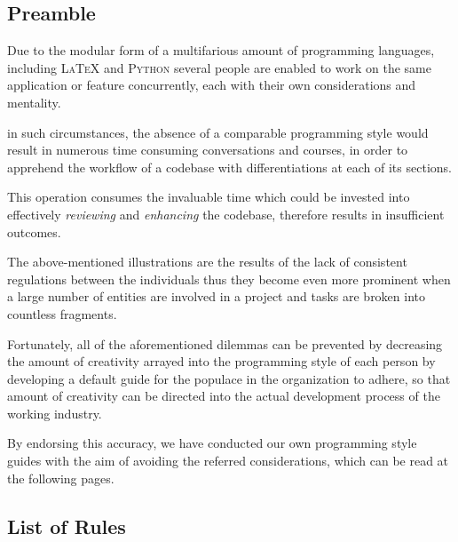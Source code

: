 \documentclass[13pt]{scrarticle}
\newcommand{\header}[1]{ \textsf{#1} \relax{}}
\newcommand{\important}[1]{\textit{#1}}
\newcommand{\name}[1]{{\textsc{#1}}}
\begin{document}
    \subsection{\header{Preamble}}


    Due to the modular form of a multifarious amount of programming languages,
    including \name{\LaTeX} and \name{Python}\footnotemark{}
    several people are enabled to work on the same application or feature concurrently,
    each with their own considerations and mentality. \newline

    in such circumstances, the absence of a comparable programming style would result in numerous time consuming conversations and courses,
    in order to apprehend the workflow of a codebase with differentiations at each of its sections. \newline

    This operation consumes the invaluable time which could be invested into effectively \important{reviewing} and \important{enhancing} the codebase,
    therefore results in insufficient outcomes. \newline


    The above-mentioned illustrations are the results of the lack of consistent regulations between the individuals
    thus they become even more prominent when a large number of entities are involved in a project
    and tasks are broken into countless fragments.
    \newline




    \newpage
    Fortunately,
    all of the aforementioned dilemmas can be prevented by decreasing the amount of creativity arrayed into
    the programming style of each person
    by developing a default guide for the populace in the organization to adhere,\newline
    so that amount of creativity can be directed into the actual development process of the working industry. \newline


    By endorsing this accuracy, we have conducted our own programming style guides with the aim of avoiding the referred considerations,
    which can be read at the following pages. \newline


    \newpage
    \subsection{\header{List of Rules}}
\end{document}

